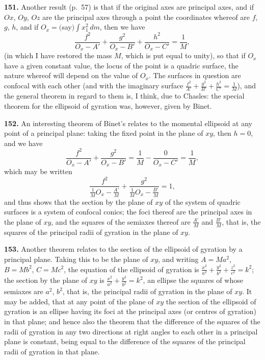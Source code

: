\documentclass[11pt,a4paper]{article}
\theoremstyle{definition}
\begin{document}
\textbf{151.} Another result (p.~57) is that if the original axes are principal axes, and if $Ox$, $Oy$, $Oz$ are the principal axes through a point the coordinates whereof are $f$, $g$, $h$, and if $O_x = ($say$)\int x_1^2\,dm$, then we have
\[
\frac{f^2}{O_x - A'} + \frac{g^2}{O_x - B'} + \frac{h^2}{O_x - C'} = \frac{1}{M},
\]
(in which I have restored the mass $M$, which is put equal to unity), so that if $O_x$ have a given constant value, the locus of the point is a quadric surface, the nature whereof will depend on the value of $O_x$. The surfaces in question are confocal with each other (and with the imaginary surface $\frac{f^2}{A'} + \frac{g^2}{B'} + \frac{h^2}{C'} = \frac{1}{M}$), and the general theorem in regard to them is, I think, due to Chasles: the special theorem for the ellipsoid of gyration was, however, given by Binet.

\textbf{152.} An interesting theorem of Binet's relates to the momental ellipsoid at any point of a principal plane: taking the fixed point in the plane of $xy$, then $h = 0$, and we have
\[
\frac{f^2}{O_x - A'} + \frac{g^2}{O_x - B'} = \frac{1}{M} - \frac{0}{O_x - C'} = \frac{1}{M},
\]
which may be written
\[
\frac{f^2}{\frac{1}{M}O_x - \frac{A'}{M}} + \frac{g^2}{\frac{1}{M}O_x - \frac{B'}{M}} = 1,
\]
and thus shows that the section by the plane of $xy$ of the system of quadric surfaces is a system of confocal conics; the foci thereof are the principal axes in the plane of $xy$, and the squares of the semiaxes thereof are $\frac{A'}{M}$ and $\frac{B'}{M}$, that is, the squares of the principal radii of gyration in the plane of $xy$.

\textbf{153.} Another theorem relates to the section of the ellipsoid of gyration by a principal plane. Taking this to be the plane of $xy$, and writing $A = Ma^2$, $B = Mb^2$, $C = Mc^2$, the equation of the ellipsoid of gyration is $\frac{x^2}{a^2} + \frac{y^2}{b^2} + \frac{z^2}{c^2} = k^2$; the section by the plane of $xy$ is $\frac{x^2}{a^2} + \frac{y^2}{b^2} = k^2$, an ellipse the squares of whose semiaxes are $a^2$, $b^2$, that is, the principal radii of gyration in the plane of $xy$. It may be added, that at any point of the plane of $xy$ the section of the ellipsoid of gyration is an ellipse having its foci at the principal axes (or centres of gyration) in that plane; and hence also the theorem that the difference of the squares of the radii of gyration in any two directions at right angles to each other in a principal plane is constant, being equal to the difference of the squares of the principal radii of gyration in that plane.
\end{document}
